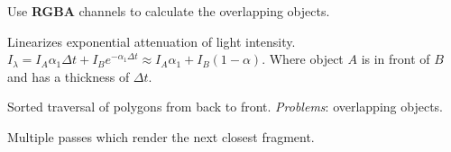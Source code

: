 Use \textbf{RGBA} channels to calculate the overlapping objects.

\begin{algorithm}
  Linearizes exponential attenuation of light intensity. \(I_\lambda = I_A \alpha_1 \Delta t + I_Be^{-\alpha_1\Delta t} \approx I_A \alpha_1 + I_B(1 - \alpha)\). Where object \(A\) is in front of \(B\) and has a thickness of \(\Delta t\).
\end{algorithm}

\begin{definition}
  Sorted traversal of polygons from back to front.
  \textit{Problems}: overlapping objects.
\end{definition}

\begin{definition}
  Multiple passes which render the next closest fragment.
\end{definition}

